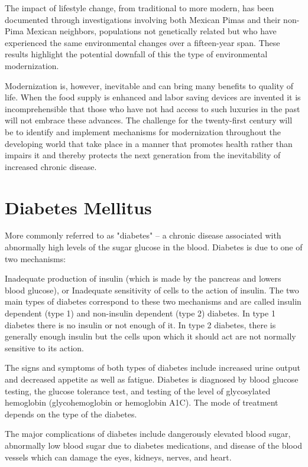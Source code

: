 \documentclass[12pt]{article}
\begin{document}
The impact of lifestyle change, from traditional to more modern, has been documented through investigations involving both Mexican Pimas and their non-Pima Mexican neighbors, populations not genetically related but who have experienced the same environmental changes over a fifteen-year span. These results highlight the potential downfall of this the type of environmental modernization.

Modernization is, however, inevitable and can bring many benefits to quality of life. When the food supply is enhanced and labor saving devices are invented it is incomprehensible that those who have not had access to such luxuries in the past will not embrace these advances. The challenge for the twenty-first century will be to identify and implement mechanisms for modernization throughout the developing world that take place in a manner that promotes health rather than impairs it and thereby protects the next generation from the inevitability of increased chronic disease.

\newpage
\section{Diabetes Mellitus}
More commonly referred to as "diabetes" -- a chronic disease associated with abnormally high levels of the sugar glucose in the blood. Diabetes is due to one of two mechanisms:

Inadequate production of insulin (which is made by the pancreas and lowers blood glucose), or
Inadequate sensitivity of cells to the action of insulin.
The two main types of diabetes correspond to these two mechanisms and are called insulin dependent (type 1) and non-insulin dependent (type 2) diabetes. In type 1 diabetes there is no insulin or not enough of it. In type 2 diabetes, there is generally enough insulin but the cells upon which it should act are not normally sensitive to its action.

The signs and symptoms of both types of diabetes include increased urine output and decreased appetite as well as fatigue. Diabetes is diagnosed by blood glucose testing, the glucose tolerance test, and testing of the level of glycosylated hemoglobin (glycohemoglobin or hemoglobin A1C). The mode of treatment depends on the type of the diabetes.

The major complications of diabetes include dangerously elevated blood sugar, abnormally low blood sugar due to diabetes medications, and disease of the blood vessels which can damage the eyes, kidneys, nerves, and heart.
\end{document}
